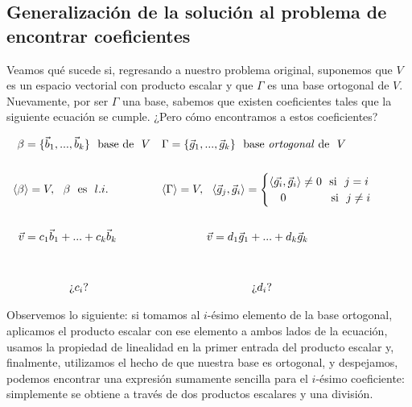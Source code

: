 \documentclass[12pt,dvipsnames]{article}
\numberwithin{equation}{section}
\begin{document}
\subsection{Generalización de la solución al problema de encontrar coeficientes}

Veamos qué sucede si, regresando a nuestro problema original, suponemos que $V$ es un espacio vectorial con producto escalar y que $\Gamma$ es una base ortogonal de $V$. Nuevamente, por ser $\Gamma$ una base, sabemos que existen coeficientes tales que la siguiente ecuación se cumple. ¿Pero cómo encontramos a estos coeficientes?

\begin{align*}
    \beta&=\{\vec{b}_1,...,\vec{b}_k\} \ \ \text{base de} \ \ V& &\Gamma=\{\vec{g}_1,...,\vec{g}_k\} \ \ \text{base \emph{ortogonal} de} \ \ V& & &\\
    \\
    \langle\beta&\rangle = V, \ \ \beta \ \ \text{es} \ \ l.i.& &\langle\Gamma\rangle = V, \ \ \langle \vec{g}_j , \vec{g}_i \rangle = \begin{cases} \langle\vec{g_i}, \vec{g}_i\rangle\neq0 \ \ \text{si} \ \ j = i \\ \quad 0 \quad \ \ \ \ \ \ \ \ \ \text{si} \ \ j\neq i \end{cases}& & &\\
    \\
    \vec{v}&= c_1\vec{b}_1 + ... + c_k\vec{b}_k& &\quad \quad \quad \quad \vec{v}= d_1\vec{g}_1 + ... + d_k\vec{g}_k& & & \\
    \\
    \\
    &\quad \quad \quad \quad \text{¿}c_i\text{?}& & \quad \quad \quad \quad \quad \quad \quad \quad \text{¿}d_i\text{?} & & &
\end{align*}

Observemos lo siguiente: si tomamos al $i$-ésimo elemento de la base ortogonal, aplicamos el producto escalar con ese elemento a ambos lados de la ecuación, usamos la propiedad de linealidad en la primer entrada del producto escalar y, finalmente, utilizamos el hecho de que nuestra base es ortogonal, y despejamos, podemos encontrar una expresión sumamente sencilla para el $i$-ésimo coeficiente: simplemente se obtiene a través de dos productos escalares y una división.
\end{document}
